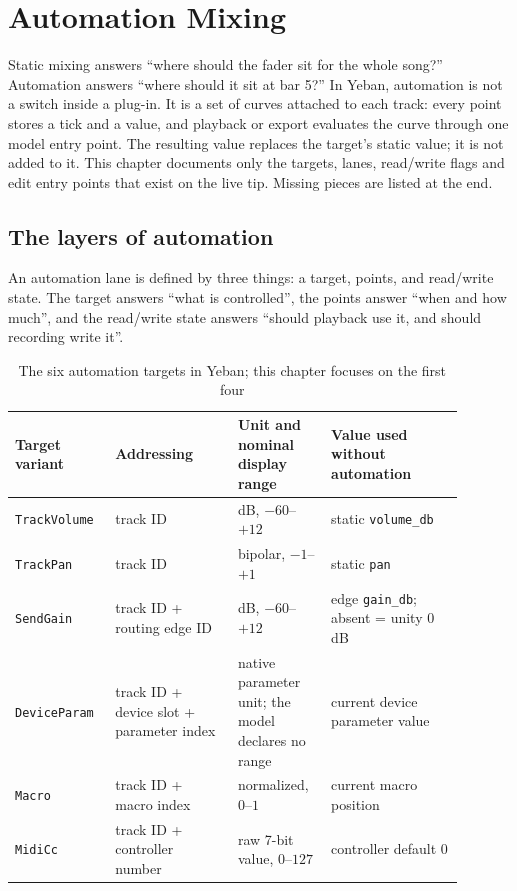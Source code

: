 \chapter{Automation Mixing}
\label{chap:automation}


Static mixing answers ``where should the fader sit for the whole song?'' Automation answers ``where should it sit at bar 5?'' In Yeban, automation is not a switch inside a plug-in. It is a set of curves attached to each track: every point stores a tick and a value, and playback or export evaluates the curve through one model entry point. The resulting value replaces the target's static value; it is not added to it. This chapter documents only the targets, lanes, read/write flags and edit entry points that exist on the live tip. Missing pieces are listed at the end.

\section{The layers of automation}

An automation lane is defined by three things: a target, points, and read/write state. The target answers ``what is controlled'', the points answer ``when and how much'', and the read/write state answers ``should playback use it, and should recording write it''.

\begin{table}[htbp]
\centering
\small
\begin{tabular}{@{}p{0.18\linewidth}p{0.25\linewidth}p{0.19\linewidth}p{0.27\linewidth}@{}}
\hline
Target variant & Addressing & Unit and nominal display range & Value used without automation \\
\hline
\texttt{TrackVolume} & track ID & dB, $-60$--$+12$ & static \texttt{volume\_db} \\
\texttt{TrackPan} & track ID & bipolar, $-1$--$+1$ & static \texttt{pan} \\
\texttt{SendGain} & track ID + routing edge ID & dB, $-60$--$+12$ & edge \texttt{gain\_db}; absent = unity 0 dB \\
\texttt{DeviceParam} & track ID + device slot + parameter index & native parameter unit; the model declares no range & current device parameter value \\
\texttt{Macro} & track ID + macro index & normalized, $0$--$1$ & current macro position \\
\texttt{MidiCc} & track ID + controller number & raw 7-bit value, $0$--$127$ & controller default 0 \\
\hline
\end{tabular}
\caption{The six automation targets in Yeban; this chapter focuses on the first four}
\label{tab:automation-targets}
\end{table}

